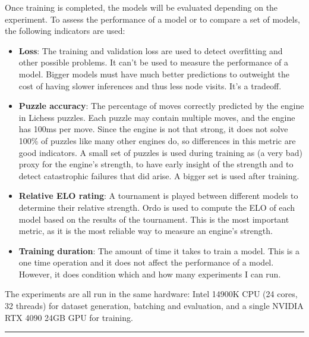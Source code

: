 Once training is completed, the models will be evaluated depending on the experiment. To assess the performance of a model or to compare a set of models, the following indicators are used:

\begin{itemize}
\item \textbf{Loss}: The training and validation loss are used to detect overfitting and other possible problems. It can't be used to measure the performance of a model. Bigger models must have much better predictions to outweight the cost of having slower inferences and thus less node visits. It's a tradeoff.

\item \textbf{Puzzle accuracy}: The percentage of moves correctly predicted by the engine in Lichess puzzles. Each puzzle may contain multiple moves, and the engine has 100ms per move. Since the engine is not that strong, it does not solve 100\% of puzzles like many other engines do, so differences in this metric are good indicators. A small set of puzzles is used during training as (a very bad) proxy for the engine's strength, to have early insight of the strength and to detect catastrophic failures that did arise. A bigger set is used after training.

\item \textbf{Relative ELO rating}: A tournament is played between different models to determine their relative strength. Ordo is used to compute the ELO of each model based on the results of the tournament. This is the most important metric, as it is the most reliable way to measure an engine's strength.


\item \textbf{Training duration}: The amount of time it takes to train a model. This is a one time operation and it does not affect the performance of a model. However, it does condition which and how many experiments I can run.
\end{itemize}

The experiments are all run in the same hardware: Intel 14900K CPU (24 cores, 32 threads) for dataset generation, batching and evaluation, and a single NVIDIA RTX 4090 24GB GPU for training.






\noindent\rule{\textwidth}{1pt}

